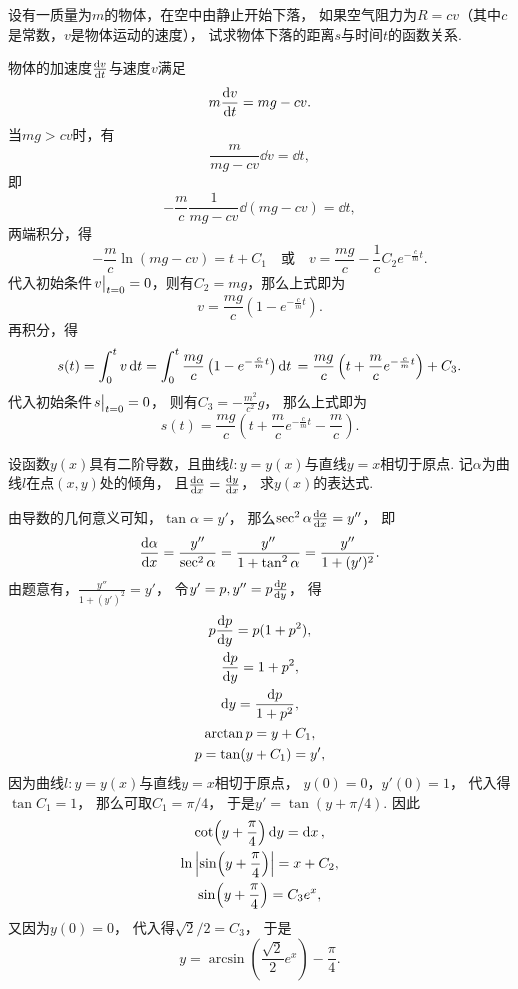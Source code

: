 \begin{example}
设有一质量为\(m\)的物体，在空中由静止开始下落，
如果空气阻力为\(R = cv\)（其中\(c\)是常数，\(v\)是物体运动的速度），
试求物体下落的距离\(s\)与时间\(t\)的函数关系.
\begin{solution}
物体的加速度\(\dv{v}{t}\)与速度\(v\)满足\[
	m \dv{v}{t} = mg - cv.
\]
当\(mg>cv\)时，有\[
	\frac{m}{mg-cv} \dd{v} = \dd{t},
\]
即\[
	-\frac{m}{c} \frac{1}{mg-cv} \dd(mg-cv) = \dd{t},
\]
两端积分，得\[
	-\frac{m}{c} \ln(mg-cv) = t + C_1
	\quad\text{或}\quad
	v = \frac{mg}{c} - \frac{1}{c} C_2 e^{-\frac{c}{m} t}.
\]
代入初始条件\(\eval{v}_{t=0} = 0\)，则有\(C_2 = mg\)，那么上式即为\[
	v = \frac{mg}{c} \left( 1 - e^{-\frac{c}{m} t} \right).
\]
再积分，得\[
	s(t) = \int_0^t v \dd{t}
	= \int_0^t \frac{mg}{c} \left( 1 - e^{-\frac{c}{m} t} \right) \dd{t} \\
	= \frac{mg}{c} \left( t + \frac{m}{c} e^{-\frac{c}{m} t} \right) + C_3.
\]
代入初始条件\(\eval{s}_{t=0} = 0\)，
则有\(C_3 = -\frac{m^2}{c^2} g\)，
那么上式即为\[
	s(t) = \frac{mg}{c} \left( t + \frac{m}{c} e^{-\frac{c}{m} t} - \frac{m}{c} \right).
\]
\end{solution}
\end{example}

\begin{example}
设函数\(y(x)\)具有二阶导数，且曲线\(l: y=y(x)\)与直线\(y=x\)相切于原点.
记\(\alpha\)为曲线\(l\)在点\((x,y)\)处的倾角，
且\(\dv{\alpha}{x}=\dv{y}{x}\)，
求\(y(x)\)的表达式.
\begin{solution}
由导数的几何意义可知，\(\tan\alpha=y'\)，
那么\(\sec^2\alpha \dv{\alpha}{x} = y''\)，
即\[
	\dv{\alpha}{x} = \frac{y''}{\sec^2\alpha}
	= \frac{y''}{1+\tan^2\alpha}
	= \frac{y''}{1+(y')^2}.
\]
由题意有，\(\frac{y''}{1+(y')^2} = y'\)，
令\(y' = p,
y'' = p\dv{p}{y}\)，
得\begin{gather*}
	p\dv{p}{y} = p(1+p^2), \\
	\dv{p}{y} = 1+p^2, \\
	\dd{y} = \frac{\dd{p}}{1+p^2}, \\
	\arctan p = y + C_1, \\
	p = \tan(y+C_1) = y',
\end{gather*}
因为曲线\(l: y=y(x)\)与直线\(y=x\)相切于原点，
\(y(0) = 0\)，\(y'(0) = 1\)，
代入得\(\tan C_1 = 1\)，
那么可取\(C_1 = \pi/4\)，
于是\(y' = \tan(y+\pi/4)\).
因此\begin{gather*}
	\cot(y+\frac{\pi}{4}) \dd{y} = \dd{x}, \\
	\ln\abs{\sin(y+\frac{\pi}{4})} = x + C_2, \\
	\sin(y+\frac{\pi}{4}) = C_3 e^x,
\end{gather*}
又因为\(y(0) = 0\)，
代入得\(\sqrt{2}/2 = C_3\)，
于是\[
	y = \arcsin(\frac{\sqrt{2}}{2} e^x) - \frac{\pi}{4}.
\]
\end{solution}
\end{example}

